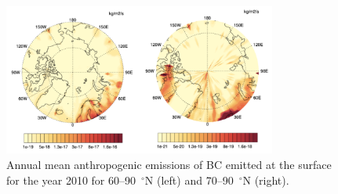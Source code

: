 \documentclass[12pt, fullpage]{uiucthesis2009_2}
\begin{document}
		\begin{figure}[h] 
			\begin{center}
				\includegraphics[width = 0.8\textwidth]{Figure11}
				\caption[Annual mean anthropogenic emissions of BC emitted at the surface for the year 2010 for 60--90~$^\circ$N (left) and 70--90~$^\circ$N (right)]{\label{fig_P11} Annual mean anthropogenic emissions of BC emitted at the surface for the year 2010 for 60--90~$^\circ$N (left) and 70--90~$^\circ$N (right).}
			\end{center}
		\end{figure}
		
\end{document}
